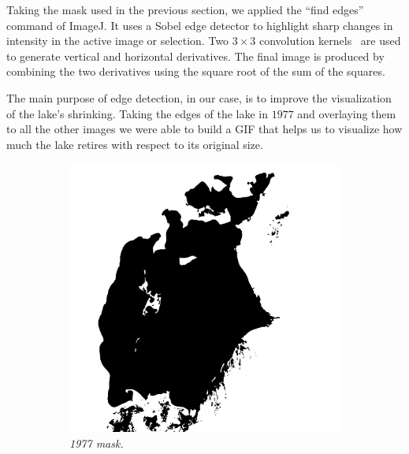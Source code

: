 Taking the mask used in the previous section, we applied the “find edges” command of ImageJ. 
It uses a Sobel edge detector to highlight sharp changes in intensity in the active image or selection. 
Two $3 \times 3$ convolution kernels~\cite{edges} are used to generate vertical and horizontal derivatives.
The final image is produced by combining the two derivatives using the square root of the sum of the squares.

The main purpose of edge detection, in our case, is to improve the visualization of the lake's shrinking. 
Taking the edges of the lake in $1977$ and overlaying them to all the other images we were able to build a GIF that helps us to visualize how much the lake retires with respect to its original size.
\begin{figure}[H]
    \centering
    \begin{subfigure}[b]{.45\textwidth}
        \includegraphics[width=\textwidth]{../img/mask.jpg}
        \caption{\emph{1977 mask.}}
    \end{subfigure}
    \begin{subfigure}[b]{.45\textwidth}

\end{subfigure}
\end{figure}
